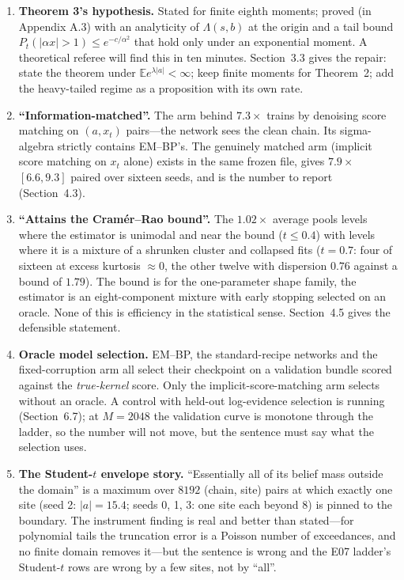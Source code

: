 \documentclass[11pt,a4paper]{article}
\newcommand{\hi}[1]{\textbf{#1}}
\newcommand{\E}{\mathbb{E}}
\theoremstyle{definition}
\theoremstyle{remark}
\begin{document}
\begin{enumerate}
\item \hi{Theorem 3's hypothesis.} Stated for finite eighth moments; proved (in Appendix A.3) with an analyticity of $\Lambda(s,b)$ at the origin and a tail bound $P_t(|\alpha x|>1)\le e^{-c/\alpha^2}$ that hold only under an exponential moment. A theoretical referee will find this in ten minutes. Section~3.3 gives the repair: state the theorem under $\E e^{\lambda|a|}<\infty$; keep finite moments for Theorem~2; add the heavy-tailed regime as a proposition with its own rate.
\item \hi{``Information-matched''.} The arm behind $7.3\times$ trains by denoising score matching on $(a, x_t)$ pairs---the network sees the clean chain. Its sigma-algebra strictly contains EM--BP's. The genuinely matched arm (implicit score matching on $x_t$ alone) exists in the same frozen file, gives $7.9\times$ $[6.6, 9.3]$ paired over sixteen seeds, and is the number to report (Section~4.3).
\item \hi{``Attains the Cram\'er--Rao bound''.} The $1.02\times$ average pools levels where the estimator is unimodal and near the bound ($t\le0.4$) with levels where it is a mixture of a shrunken cluster and collapsed fits ($t=0.7$: four of sixteen at excess kurtosis $\approx0$, the other twelve with dispersion $0.76$ against a bound of $1.79$). The bound is for the one-parameter shape family, the estimator is an eight-component mixture with early stopping selected on an oracle. None of this is efficiency in the statistical sense. Section~4.5 gives the defensible statement.
\item \hi{Oracle model selection.} EM--BP, the standard-recipe networks and the fixed-corruption arm all select their checkpoint on a validation bundle scored against the \emph{true-kernel} score. Only the implicit-score-matching arm selects without an oracle. A control with held-out log-evidence selection is running (Section~6.7); at $M=2048$ the validation curve is monotone through the ladder, so the number will not move, but the sentence must say what the selection uses.
\item \hi{The Student-$t$ envelope story.} ``Essentially all of its belief mass outside the domain'' is a maximum over $8192$ (chain, site) pairs at which exactly one site (seed 2: $|a|=15.4$; seeds 0, 1, 3: one site each beyond $8$) is pinned to the boundary. The instrument finding is real and better than stated---for polynomial tails the truncation error is a Poisson number of exceedances, and no finite domain removes it---but the sentence is wrong and the E07 ladder's Student-$t$ rows are wrong by a few sites, not by ``all''.

\end{enumerate}
\end{document}
